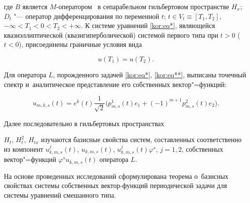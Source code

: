 где $B$ является $M$-оператором~\cite{kor:bib2} в сепарабельном гильбертовом пространстве $H_x$; $D_t$ "--- оператор дифференцирования по переменной $t$; $t\in V_t\equiv[T_1,T_2]$, $-\infty<T_1<0<T_2<+\infty$. К системе уравнений \eqref{kor:eq*}, являющейся квазиэллиптической (квазигиперболической) системой первого типа \cite{kor:bib7} при $t>0$ ($t<0$), присоединены граничные условия вида 

\begin{equation}

\label{kor:eq**}

u(T_1)=u(T_2).

\end{equation}



Для оператора $L$, порожденного задачей \eqref{kor:eq*}, \eqref{kor:eq**}, выписаны точечный спектр и~аналитическое представление его собственных вектор"=функций:

$$u_{m,k,s}(t)=e^k(t)\frac1{\sqrt2}\bigl( {p_{m,s}^1(t)e_1+(-1)^{m+1}p_{m,s}^2(t)e_2}\bigr).$$



Далее последовательно в гильбертовых пространствах

$H_t$, $H_t^2$, $H_{tx}$ изучаются базисные свойства систем, составленных соответственно из компонент $u_{k,m,s}^j(t)$, $u_{k,m,s}(t)$, $u_{k,m,s}^j(t)\varphi^s$, $j=1, 2$, собственных вектор"=функций $\varphi^su_{k,m,s}(t)$ оператора $L$. 

На основе проведенных исследований сформулирована теорема о~базисных свойствах системы собственных вектор-функций периодической задачи для системы уравнений смешанного типа.


%


%






